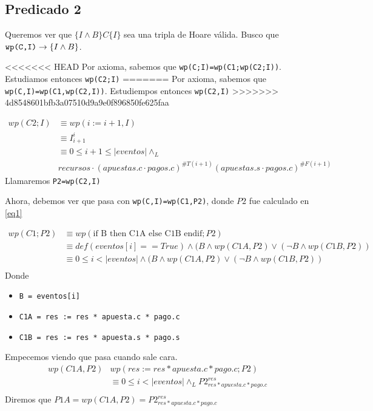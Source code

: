 \documentclass[../document.tex]{subfiles}
\begin{document}
\subsection*{Predicado 2}
Queremos ver que $\{I \land B\}C\{I\}$ sea una tripla de Hoare válida. Busco que $\verb+wp(C,I)+ \to \{I \land B\}$.

<<<<<<< HEAD
Por axioma, sabemos que \verb+wp(C;I)=wp(C1;wp(C2;I))+. Estudiamos entonces \verb|wp(C2;I)|
=======
Por axioma, sabemos que \verb+wp(C,I)=wp(C1,wp(C2,I))+. Estudiempos entonces \verb|wp(C2,I)|
>>>>>>> 4d8548601bfb3a07510d9a9e0f896850fe625faa

\begin{equation} \label{eq1}
\begin{split}
wp(C2;I) & \equiv wp(i := i+1,I) \\
         & \equiv I^{i}_{i+1} \\
         & \equiv 0\leq i+1 \leq |eventos| \land_L\\ 
         &recursos \cdot (apuestas.c\cdot pagos.c)^{\#T(i+1)}(apuestas.s\cdot pagos.c)^{\#F(i+1)}
\end{split}
\end{equation}
Llamaremos \verb|P2=wp(C2,I)|

Ahora, debemos ver que pasa con \verb+wp(C,I)=wp(C1,P2)+, donde $P2$ fue calculado en \ref{eq1}

\begin{equation} \label{eq2}
\begin{split}
wp(C1;P2) & \equiv wp(\text{if B then C1A else C1B endif};P2) \\
          & \equiv def(eventos[i]==True) \land (B \land wp(C1A, P2) \lor (\neg B \land wp(C1B, P2)) \\
          & \equiv 0\leq i < |eventos| \land (B \land wp(C1A, P2) \lor (\neg B \land wp(C1B, P2)) \\
\end{split}
\end{equation}
Donde
\begin{itemize}
    \item \verb|B = eventos[i]|
    \item \verb|C1A = res := res * apuesta.c * pago.c|
    \item \verb|C1B = res := res * apuesta.s * pago.s|
\end{itemize}

Empecemos viendo que pasa cuando sale cara.
\begin{equation} \label{eq2.a}
\begin{split}
wp(C1A,P2) & wp(res := res * apuesta.c * pago.c; P2) \\
           & \equiv 0\leq i<|eventos| \land_{L} P2^{res}_{res * apuesta.c * pago.c} \\
\end{split}
\end{equation}
Diremos que $P1A = wp(C1A,P2) = P2^{res}_{res * apuesta.c * pago.c}$
\end{document}
